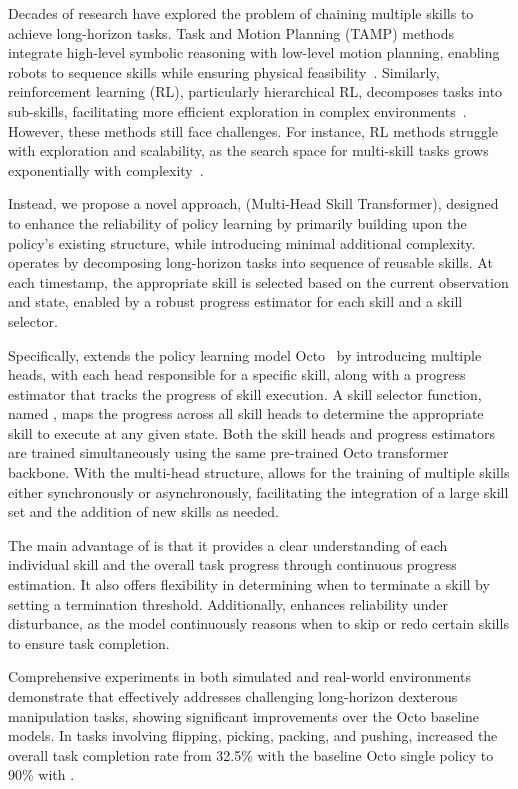 Decades of research have explored the problem of chaining multiple skills to achieve long-horizon tasks. Task and Motion Planning (TAMP) methods integrate high-level symbolic reasoning with low-level motion planning, enabling robots to sequence skills while ensuring physical feasibility~\cite{Dantam16, Srivastava14, Wolfe10}. Similarly, reinforcement learning (RL), particularly hierarchical RL, decomposes tasks into sub-skills, facilitating more efficient exploration in complex environments~\cite{kulkarni2016hierarchicaldeepreinforcementlearning, eysenbach2018diversityneedlearningskills, vezhnevets2017feudalnetworkshierarchicalreinforcement, bacon2016optioncriticarchitecture}. However, these methods still face challenges. For instance, RL methods struggle with exploration and scalability, as the search space for multi-skill tasks grows exponentially with complexity~\cite{nasiriany2022augmenting}. %

Instead, we propose a novel approach, \ours (Multi-Head Skill Transformer), designed to enhance the reliability of policy learning by primarily building upon the policy's existing structure, while introducing minimal additional complexity. \ours operates by decomposing long-horizon tasks into sequence of reusable skills. At each timestamp, the appropriate skill is selected based on the current observation and state, enabled by a robust progress estimator for each skill and a skill selector. 

Specifically, \ours extends the policy learning model Octo~\cite{team2024octo} by introducing multiple heads, with each head responsible for a specific skill, along with a progress estimator that tracks the progress of skill execution. A skill selector function, named \progss, maps the progress across all skill heads to determine the appropriate skill to execute at any given state. Both the skill heads and progress estimators are trained simultaneously using the same pre-trained Octo transformer backbone. With the multi-head structure, \ours allows for the training of multiple skills either synchronously or asynchronously, facilitating the integration of a large skill set and the addition of new skills as needed.

The main advantage of \ours is that it provides a clear understanding of each individual skill and the overall task progress through continuous progress estimation. It also offers flexibility in determining when to terminate a skill by setting a termination threshold. Additionally, \ours enhances reliability under disturbance, as the model continuously reasons when to skip or redo certain skills to ensure task completion.

Comprehensive experiments in both simulated and real-world environments demonstrate that \ours effectively addresses challenging long-horizon dexterous manipulation tasks, showing significant improvements over the Octo baseline models. In tasks involving flipping, picking, packing, and pushing, \ours increased the overall task completion rate from 32.5\% with the baseline Octo single policy to 90\% with \ours.

